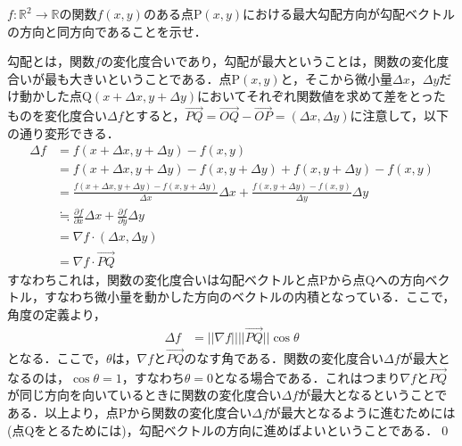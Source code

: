 \begin{qu}
$f:\mathbb{R}^2 \to \mathbb{R}$の関数$f(x,y)$のある点P$(x,y)$における最大勾配方向が勾配ベクトルの方向と同方向であることを示せ．
\end{qu}
\begin{ans}
勾配とは，関数$f$の変化度合いであり，勾配が最大ということは，関数の変化度合いが最も大きいということである．点P$(x,y)$と，そこから微小量$\Delta x$，$\Delta y$だけ動かした点Q$(x+\Delta x,y+\Delta y)$においてそれぞれ関数値を求めて差をとったものを変化度合い$\Delta f$とすると，$\overrightarrow{PQ}=\overrightarrow{OQ}-\overrightarrow{OP}=(\Delta x,\Delta y)$に注意して，以下の通り変形できる．
\begin{align*}
\Delta f &= f(x+\Delta x,y+\Delta y)-f(x,y) \\
&= f(x+\Delta x,y+\Delta y) -f(x,y+\Delta y)+f(x,y+\Delta y) -f(x,y) \\
&= \frac{f(x+\Delta x,y+\Delta y) -f(x,y+\Delta y)}{\Delta x}\Delta x +\frac{f(x,y+\Delta y) -f(x,y)}{\Delta y}\Delta y \\
&\fallingdotseq \frac{\partial f}{\partial x}\Delta x +\frac{\partial f}{\partial y}\Delta y \\
&= \nabla f \cdot (\Delta x,\Delta y) \\
&= \nabla f \cdot \overrightarrow{PQ}
\end{align*}
すなわちこれは，関数の変化度合いは勾配ベクトルと点Pから点Qへの方向ベクトル，すなわち微小量を動かした方向のベクトルの内積となっている．ここで，角度の定義より，
\begin{align*}
\Delta f &= ||\nabla f||||\overrightarrow{PQ}||\cos \theta
\end{align*}
となる．ここで，$\theta$は，$\nabla f$と$\overrightarrow{PQ}$のなす角である．関数の変化度合い$\Delta f$が最大となるのは，$\cos \theta =1$，すなわち$\theta =0$となる場合である．これはつまり$\nabla f$と$\overrightarrow{PQ}$が同じ方向を向いているときに関数の変化度合い$\Delta f$が最大となるということである．以上より，点Pから関数の変化度合い$\Delta f$が最大となるように進むためには(点Qをとるためには)，勾配ベクトルの方向に進めばよいということである．\qed
\end{ans}


